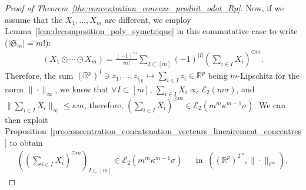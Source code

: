 \documentclass{ws-rmta}
\begin{document}
\begin{proof}[Proof of Theorem~\ref{the:concentration_convexe_produit_odot_Rp}]
  Now, if we assume that the $X_1,\ldots, X_m$ are different, we employ Lemma~\ref{lem:decomposition_poly_symetrique} in this commutative case to write ($|\mathfrak S_m | = m!$):
  \begin{align}\label{eq:decomposition_x_1_odot_x_m}
     (X_1\odot \cdots \odot X_m) = \frac{(-1)^m}{m!} \sum_{I\subset [m]} (-1)^{|I|} \left(\sum_{i\in I} X_i\right)^{\odot m}.
   \end{align} 
  Therefore, the sum $(\mathbb R^p)^I \ni z_1,\ldots, z_{i_{|I|}}  \mapsto \sum_{i\in I} z_i \in \mathbb R^p$ being $m$-Lipschitz for the norm $\|\cdot \|_\infty$, we know that $\forall I \subset [m]$, $\sum_{i\in I} X_i \propto_c \mathcal E_2(m\sigma) $, and $\|\sum_{i\in I} X_i\|_\infty \leq \kappa m$, therefore, $(\sum_{i\in I} X_i)^{\odot m} \in \mathcal E_2(m^m\kappa^{m-1} \sigma )$.
  We can then exploit Proposition~\ref{pro:concentration_concatenation_vecteurs_lineairement_concentres} to obtain
  \begin{align*}
    \left(\left(\sum_{i\in I} X_i\right)^{\odot m}\right)_{I \subset [m]} \in \mathcal E_2(m^m\kappa^{m-1} \sigma ) &
    &\text{in } \ \left((\mathbb R^p)^{2^m}, \| \cdot \|_{\ell^\infty}\right),

\end{align*}
\end{proof}
\end{document}

